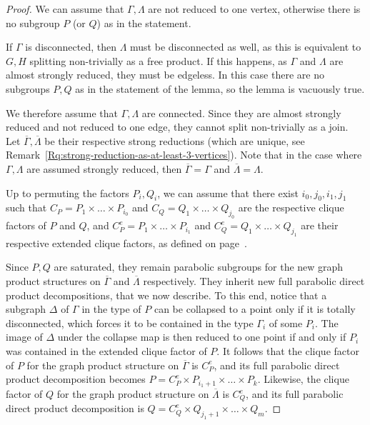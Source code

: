 \documentclass[a4paper,english,11pt]{article}
\theoremstyle{definition}
\theoremstyle{remark}
\begin{document}
\begin{proof} We can assume that $\Gamma,\Lambda$ are not reduced to one vertex, otherwise there is no subgroup $P$ (or $Q$) as in the statement.

If $\Gamma$ is disconnected, then $\Lambda$ must be disconnected as well, as this is equivalent to $G,H$ splitting non-trivially as a free product. If this happens, as $\Gamma$ and $\Lambda$ are almost strongly reduced, they must be edgeless. In this case there are no subgroups $P,Q$ as in the statement of the lemma, so the lemma is vacuously true.

We therefore assume that $\Gamma,\Lambda$ are connected. Since they are almost strongly reduced and not reduced to one edge, they cannot split non-trivially as a join. Let $\overline{\Gamma},\overline{\Lambda}$ be their respective strong reductions (which are unique, see Remark~\ref{Rq:strong-reduction-as-at-least-3-vertices}). Note that in the case where $\Gamma,\Lambda$ are assumed strongly reduced, then $\overline{\Gamma}=\Gamma$ and $\overline{\Lambda}=\Lambda$.

Up to permuting the factors $P_i,Q_i$, we can assume that there exist $i_0,j_0,i_1,j_1$ such that $C_P=P_1\times \dots \times P_{i_0}$ and $C_Q=Q_1 \times \dots \times Q_{j_0}$ are the respective clique factors of $P$ and $Q$, and $C^e_P=P_1\times \dots \times P_{i_1}$ and $C^e_Q=Q_1 \times \dots \times Q_{j_1}$ are their respective extended clique factors, as defined on page~\pageref{de:extended-clique-factor}. 
  
   Since $P,Q$ are saturated, they remain parabolic subgroups for the new graph product structures on $\overline{\Gamma}$ and $\overline{\Lambda}$ respectively. They inherit new full parabolic direct product decompositions, that we now describe. To this end, notice that a subgraph $\Delta$ of $\Gamma$ in the type of $P$ can be collapsed to a point only if it is totally disconnected, which forces it to be contained in the type $\Gamma_i$ of some $P_i$. The image of $\Delta$ under the collapse map is then reduced to one point if and only if $P_i$ was contained in the extended clique factor of $P$. It follows that the clique factor of $P$ for the graph product structure on $\overline{\Gamma}$ is $C_P^e$, and its full parabolic direct product decomposition becomes $P=C_P^e\times P_{i_1+1}\times\dots\times P_k$. Likewise, the clique factor of $Q$ for the graph product structure on $\overline{\Lambda}$ is $C_Q^e$, and its full parabolic direct product decomposition is $Q=C_Q^e\times Q_{j_1+1}\times\dots\times Q_m$.
\medskip


\end{proof}
\end{document}
